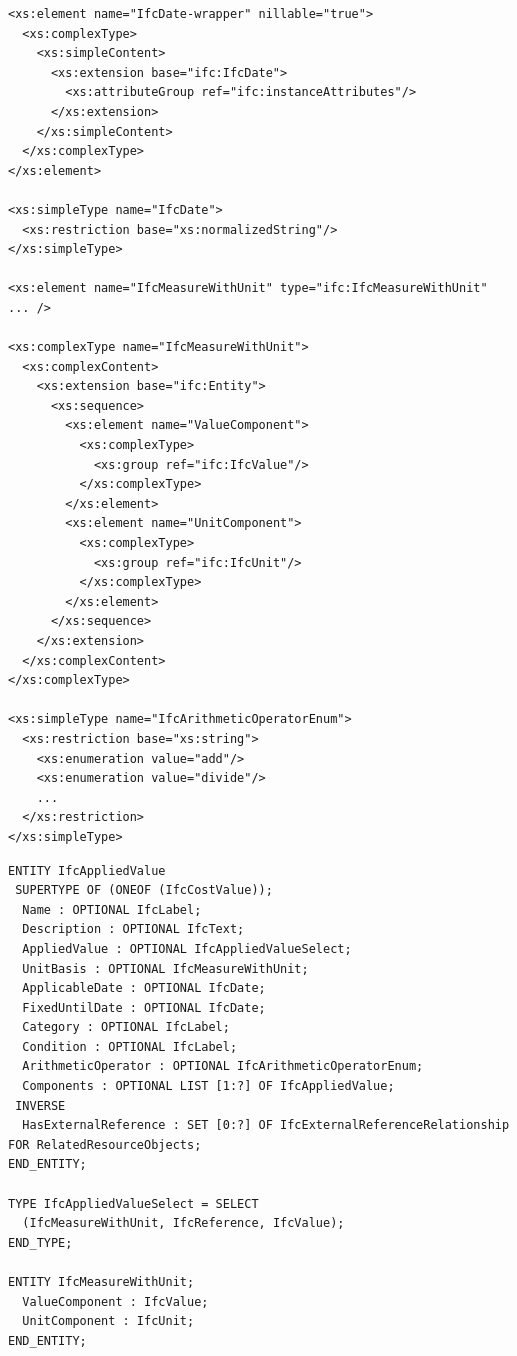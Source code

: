 \begin{lstlisting}[caption={ifcXML4 XSD schema: Element \texttt{IfcAppliedValue} and related types},label=lst:ifc-xsd-type-IfcAppliedValue]
<xs:element name="IfcDate-wrapper" nillable="true">
  <xs:complexType>
    <xs:simpleContent>
      <xs:extension base="ifc:IfcDate">
        <xs:attributeGroup ref="ifc:instanceAttributes"/>
      </xs:extension>
    </xs:simpleContent>
  </xs:complexType>
</xs:element>

<xs:simpleType name="IfcDate">
  <xs:restriction base="xs:normalizedString"/>
</xs:simpleType>

<xs:element name="IfcMeasureWithUnit" type="ifc:IfcMeasureWithUnit" ... />

<xs:complexType name="IfcMeasureWithUnit">
  <xs:complexContent>
    <xs:extension base="ifc:Entity">
      <xs:sequence>
        <xs:element name="ValueComponent">
          <xs:complexType>
            <xs:group ref="ifc:IfcValue"/>
          </xs:complexType>
        </xs:element>
        <xs:element name="UnitComponent">
          <xs:complexType>
            <xs:group ref="ifc:IfcUnit"/>
          </xs:complexType>
        </xs:element>
      </xs:sequence>
    </xs:extension>
  </xs:complexContent>
</xs:complexType>
  
<xs:simpleType name="IfcArithmeticOperatorEnum">
  <xs:restriction base="xs:string">
    <xs:enumeration value="add"/>
    <xs:enumeration value="divide"/>
    ...
  </xs:restriction>
</xs:simpleType>
\end{lstlisting}



\begin{lstlisting}[caption={EXPRESS schema: entity type \texttt{IfcAppliedValue}},label=lst:ifc-xsd-entity-type]
ENTITY IfcAppliedValue
 SUPERTYPE OF (ONEOF (IfcCostValue));
  Name : OPTIONAL IfcLabel;
  Description : OPTIONAL IfcText;
  AppliedValue : OPTIONAL IfcAppliedValueSelect;
  UnitBasis : OPTIONAL IfcMeasureWithUnit;
  ApplicableDate : OPTIONAL IfcDate;
  FixedUntilDate : OPTIONAL IfcDate;
  Category : OPTIONAL IfcLabel;
  Condition : OPTIONAL IfcLabel;
  ArithmeticOperator : OPTIONAL IfcArithmeticOperatorEnum;
  Components : OPTIONAL LIST [1:?] OF IfcAppliedValue;
 INVERSE
  HasExternalReference : SET [0:?] OF IfcExternalReferenceRelationship FOR RelatedResourceObjects;
END_ENTITY;

TYPE IfcAppliedValueSelect = SELECT
  (IfcMeasureWithUnit, IfcReference, IfcValue);
END_TYPE;

ENTITY IfcMeasureWithUnit;
  ValueComponent : IfcValue;
  UnitComponent : IfcUnit;
END_ENTITY;




\end{lstlisting}





